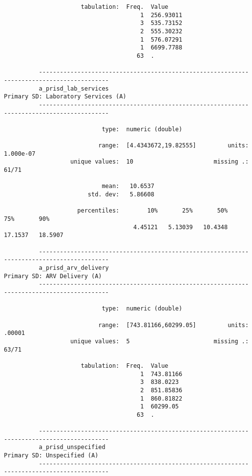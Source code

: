 \documentclass{article}
\begin{document}
\begin{verbatim}
                      tabulation:  Freq.  Value
                                       1  256.93011
                                       3  535.73152
                                       2  555.30232
                                       1  576.07291
                                       1  6699.7788
                                      63  .
          
          ------------------------------------------------------------------------------------------
          a_prisd_lab_services                                   Primary SD: Laboratory Services (A)
          ------------------------------------------------------------------------------------------
          
                            type:  numeric (double)
          
                           range:  [4.4343672,19.82555]         units:  1.000e-07
                   unique values:  10                       missing .:  61/71
          
                            mean:   10.6537
                        std. dev:   5.86608
          
                     percentiles:        10%       25%       50%       75%       90%
                                     4.45121   5.13039   10.4348   17.1537   18.5907
          
          ------------------------------------------------------------------------------------------
          a_prisd_arv_delivery                                          Primary SD: ARV Delivery (A)
          ------------------------------------------------------------------------------------------
          
                            type:  numeric (double)
          
                           range:  [743.81166,60299.05]         units:  .00001
                   unique values:  5                        missing .:  63/71
          
                      tabulation:  Freq.  Value
                                       1  743.81166
                                       3  838.0223
                                       2  851.85836
                                       1  860.81822
                                       1  60299.05
                                      63  .
          
          ------------------------------------------------------------------------------------------
          a_prisd_unspecified                                            Primary SD: Unspecified (A)
          ------------------------------------------------------------------------------------------
          

\end{verbatim}
\end{document}
